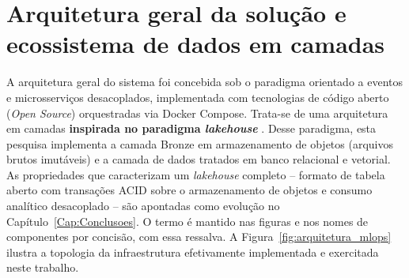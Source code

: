 \section{Arquitetura geral da solução e ecossistema de dados em camadas}
\label{sec:sol_arquitetura}

A arquitetura geral do sistema foi concebida sob o paradigma orientado a eventos e microsserviços desacoplados, implementada com tecnologias de código aberto (\textit{Open Source}) orquestradas via Docker Compose. Trata-se de uma arquitetura em camadas \textbf{inspirada no paradigma \textit{lakehouse}} \cite{armbrust2021lakehouse}. Desse paradigma, esta pesquisa implementa a camada Bronze em armazenamento de objetos (arquivos brutos imutáveis) e a camada de dados tratados em banco relacional e vetorial. As propriedades que caracterizam um \textit{lakehouse} completo -- formato de tabela aberto com transações ACID sobre o armazenamento de objetos e consumo analítico desacoplado -- são apontadas como evolução no Capítulo~\ref{Cap:Conclusoes}. O termo é mantido nas figuras e nos nomes de componentes por concisão, com essa ressalva. A Figura~\ref{fig:arquitetura_mlops} ilustra a topologia da infraestrutura efetivamente implementada e exercitada neste trabalho.

